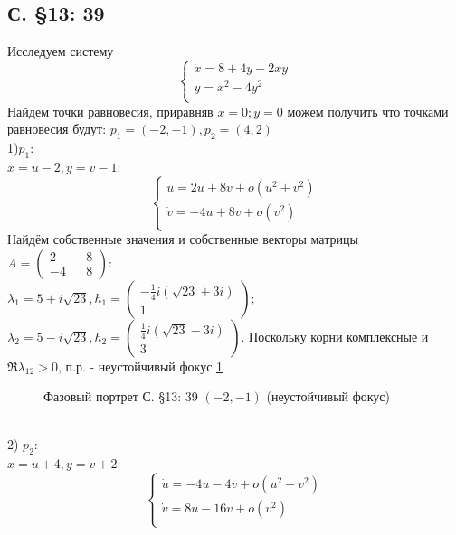 \documentclass{article}
\begin{document}
\subsection{С. \S13: 39}
Исследуем систему 
\begin{equation}
\begin{cases}
        \dot{x}=8+4y-2xy\\
        \dot{y}=x^2-4y^2\\
    \end{cases}    
\end{equation}
Найдем точки равновесия, приравняв $\dot{x}=0; \dot{y}=0$ можем получить что точками равновесия будут: $p_1=(-2,-1), p_2=(4,2)$\\

1)$p_1$:\\
$x=u-2,y=v-1$:
\begin{equation}
\begin{cases}
        \dot{u}=2u+8v+o(u^2+v^2)\\
        \dot{v}=-4u+8v+o(v^2)\\
    \end{cases}    
\end{equation}
Найдём собственные значения и собственные векторы матрицы $A=\begin{pmatrix} 2 && 8 \\ -4 && 8 \end{pmatrix}$:\\
 $\lambda_1=5+i \sqrt{23},
 h_1 = \begin{pmatrix} -\frac{1}{4} i \left(\sqrt{23}+3 i\right) \\  1 \end{pmatrix} $; 
 $\lambda_2= 5-i \sqrt{23},
 h_2 = \begin{pmatrix} \frac{1}{4} i \left(\sqrt{23}-3 i\right)  \\  3 \end{pmatrix} $. 
 Поскольку корни комплексные и $\Re \lambda_{12}>0$, п.р. - неустойчивый фокус \ref{13.39.1}
 \begin{figure}[ht]
\caption{Фазовый портрет С. \S13: 39 $(-2,-1)$ (неустойчивый фокус)}
\label{13.39.1}
\end{figure}\\  
2) $p_2$:\\
$x=u+4,y=v+2$:
\begin{equation}
\begin{cases}
        \dot{u}=-4u-4v+o(u^2+v^2)\\
        \dot{v}=8u-16v+o(v^2)\\
    \end{cases}    
\end{equation}
\end{document}
